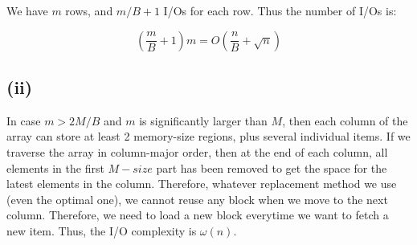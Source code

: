  We have $m$ rows, and $m/B + 1$ I/Os for each row. Thus the number of I/Os is:

 $$(\frac{m}{B} + 1)m = O(\frac{n}{B} + \sqrt{n})$$

\subsection*{(ii)}
In case $m > 2M/B$ and $m$ is significantly larger than $M$, then each column of the array can store at least 2 memory-size regions, plus several individual items. If we traverse the array in column-major order, then at the end of each column, all elements in the first $M-size$ part has been removed to get the space for the latest elements in the column. Therefore, whatever replacement method we use (even the optimal one), we cannot reuse any block when we move to the next column. Therefore, we need to load a new block everytime we want to fetch a new item. Thus, the I/O complexity is $\omega(n)$.\\

